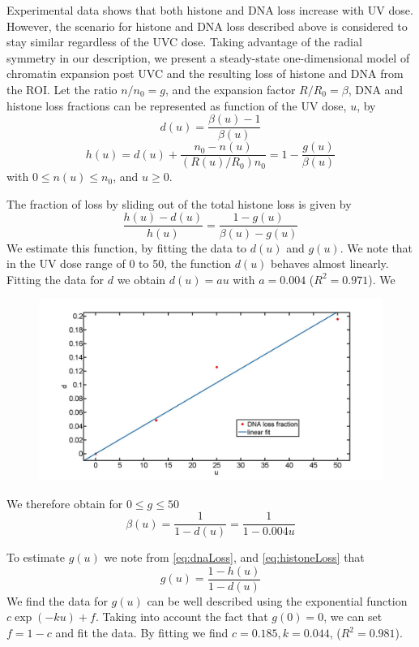 \documentclass[12pt]{report}
\begin{document}
   Experimental data shows that both histone and DNA loss increase with UV dose. However, the scenario for histone and DNA loss described above is considered to stay similar regardless of the UVC dose. Taking advantage of the radial symmetry in our description, we present a steady-state one-dimensional model of chromatin expansion post UVC and the resulting loss of histone and DNA from the ROI. Let the ratio $n/n_0 =g$, and the expansion factor $R/R_0=\beta$, DNA and histone loss fractions can be represented as function of the UV dose, $u$, by
	\begin{equation}\label{eq:dnaLoss}
	d(u) = \frac{\beta(u)-1}{\beta(u)}
	\end{equation}
	\begin{equation}\label{eq:histoneLoss}
	h(u) = d(u) +\frac{n_0-n(u)}{(R(u)/R_0) n_0}=1-\frac{g(u)}{\beta(u)}
	\end{equation}
 with $0\leq n(u)\leq n_0$, and $u\geq0$. 
 
The fraction of loss by sliding out of the total histone loss is given by
\begin{equation}\label{eq:contributionOfSliding}
\frac{h(u)-d(u)}{h(u)}=\frac{1-g(u)}{\beta(u)-g(u)}
\end{equation}
We estimate this function, by fitting the data to $d(u)$ and $g(u)$. We note that in the UV dose range of 0 to 50, the function $d(u)$ behaves almost linearly. Fitting the data for $d$ we obtain  $d(u)=au$ with $a=0.004$ ($R^2= 0.971$). We 
\begin{figure}[H]
	\centering
\includegraphics[width=0.5\linewidth, height=0.3\textheight]{Images/dVsUVdoseFitLinear}
\caption{}
\label{fig:dVsUVdoseFitLinear}
\end{figure}
We therefore obtain for $0\leq g \leq 50$
\begin{equation}
\beta(u) = \frac{1}{1-d(u)}=\frac{1}{1-0.004u}
\end{equation} 

To estimate $g(u)$ we note from \ref{eq:dnaLoss}, and \ref{eq:histoneLoss} that 
\begin{equation*}
g(u)=\frac{1-h(u)}{1-d(u)}
\end{equation*}
We find the data for $g(u)$ can be well described using the exponential function $c\exp(-ku) +f$. Taking into account the fact that $g(0)=0$, we can set $f=1-c$ and fit the data. By fitting we find $c=0.185, k=0.044$, ($R^2 =0.981$).
\end{document}
